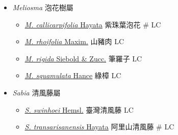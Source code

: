 
  \begin{itemize}
 \item[] \textit{Meliosma} 泡花樹屬
                                
  \begin{itemize}
        \item[] \href{http://www.theplantlist.org/tpl1.1/search?q=Meliosma+callicarpifolia}{\textit{M. callicarpifolia} Hayata}   紫珠葉泡花  \# LC
        \item[] \href{http://www.theplantlist.org/tpl1.1/search?q=Meliosma+rhoifolia}{\textit{M. rhoifolia} Maxim.}   山豬肉   LC
        \item[] \href{http://www.theplantlist.org/tpl1.1/search?q=Meliosma+rigida}{\textit{M. rigida} Siebold \& Zucc.}   筆羅子   LC
        \item[] \href{http://www.theplantlist.org/tpl1.1/search?q=Meliosma+squamulata}{\textit{M. squamulata} Hance}   綠樟   LC
  \end{itemize}
 \item[] \textit{Sabia} 清風藤屬
                                
  \begin{itemize}
        \item[] \href{http://www.theplantlist.org/tpl1.1/search?q=Sabia+swinhoei}{\textit{S. swinhoei} Hemsl.}   臺灣清風藤   LC
        \item[] \href{http://www.theplantlist.org/tpl1.1/search?q=Sabia+transarisanensis}{\textit{S. transarisanensis} Hayata}   阿里山清風藤  \# LC
  \end{itemize}
  \end{itemize}
